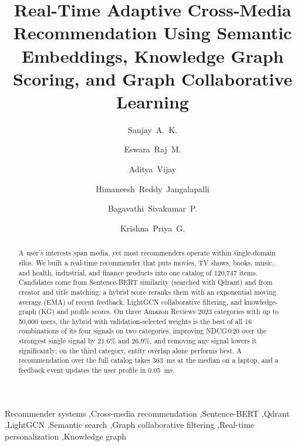 \documentclass[3p,times,procedia]{elsarticle}
\begin{document}
\begin{frontmatter}


\title{Real-Time Adaptive Cross-Media Recommendation Using Semantic Embeddings, Knowledge Graph Scoring, and Graph Collaborative Learning}

\author[a]{Sanjay~A.~K.}
\author[a]{Eswara~Raj~M.}
\author[a]{Aditya~Vijay}
\author[a]{Himaneesh~Reddy~Jangalapalli}
\author[a]{Bagavathi~Sivakumar~P.}
\author[a]{Krishna~Priya~G.}

\address[a]{Department of Computer Science and Engineering, Amrita School of Computing, Coimbatore, Amrita Vishwa Vidyapeetham, India}

\begin{abstract}
A user's interests span media, yet most recommenders operate within single-domain silos. We built a real-time recommender that puts movies, TV shows, books, music, and health, industrial, and finance products into one catalog of 120,747 items. Candidates come from Sentence-BERT similarity (searched with Qdrant) and from creator and title matching; a hybrid score reranks them with an exponential moving average (EMA) of recent feedback, LightGCN collaborative filtering, and knowledge-graph (KG) and profile scores. On three Amazon Reviews 2023 categories with up to 50,000 users, the hybrid with validation-selected weights is the best of all 16 combinations of its four signals on two categories, improving NDCG@20 over the strongest single signal by 21.6\% and 26.9\%, and removing any signal lowers it significantly; on the third category, entity overlap alone performs best. A recommendation over the full catalog takes 363~ms at the median on a laptop, and a feedback event updates the user profile in 0.05~ms.
\end{abstract}

\begin{keyword}
Recommender systems \sep Cross-media recommendation \sep Sentence-BERT \sep Qdrant \sep LightGCN \sep Semantic search \sep Graph collaborative filtering \sep Real-time personalization \sep Knowledge graph
\end{keyword}

\end{frontmatter}
\end{document}
